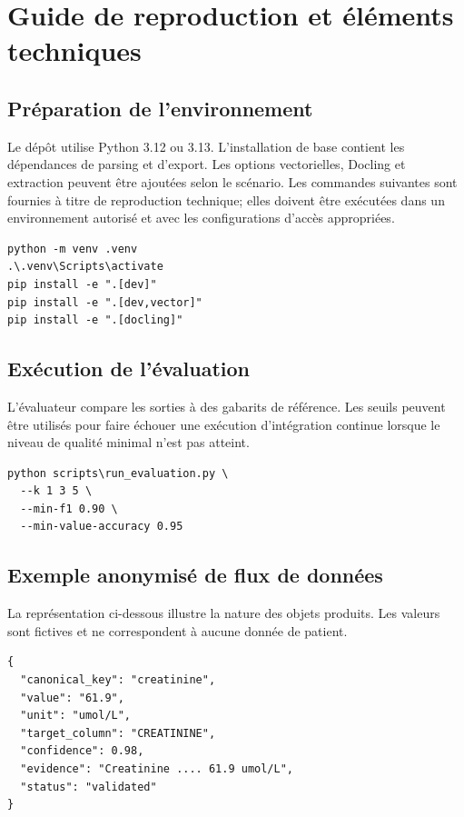 \chapter{Guide de reproduction et éléments techniques}
\section{Préparation de l'environnement}
Le dépôt utilise Python 3.12 ou 3.13. L'installation de base contient les dépendances de parsing et d'export. Les options vectorielles, Docling et extraction peuvent être ajoutées selon le scénario. Les commandes suivantes sont fournies à titre de reproduction technique; elles doivent être exécutées dans un environnement autorisé et avec les configurations d'accès appropriées.

\begin{lstlisting}[caption={Création d'un environnement et installation des dépendances}]
python -m venv .venv
.\.venv\Scripts\activate
pip install -e ".[dev]"
pip install -e ".[dev,vector]"
pip install -e ".[docling]"
\end{lstlisting}

\section{Exécution de l'évaluation}
L'évaluateur compare les sorties à des gabarits de référence. Les seuils peuvent être utilisés pour faire échouer une exécution d'intégration continue lorsque le niveau de qualité minimal n'est pas atteint.

\begin{lstlisting}[caption={Exemple de commande d'évaluation}]
python scripts\run_evaluation.py \
  --k 1 3 5 \
  --min-f1 0.90 \
  --min-value-accuracy 0.95
\end{lstlisting}

\section{Exemple anonymisé de flux de données}
La représentation ci-dessous illustre la nature des objets produits. Les valeurs sont fictives et ne correspondent à aucune donnée de patient.

\begin{lstlisting}[caption={Exemple de candidat exportable anonymisé}]
{
  "canonical_key": "creatinine",
  "value": "61.9",
  "unit": "umol/L",
  "target_column": "CREATININE",
  "confidence": 0.98,
  "evidence": "Creatinine .... 61.9 umol/L",
  "status": "validated"
}
\end{lstlisting}

